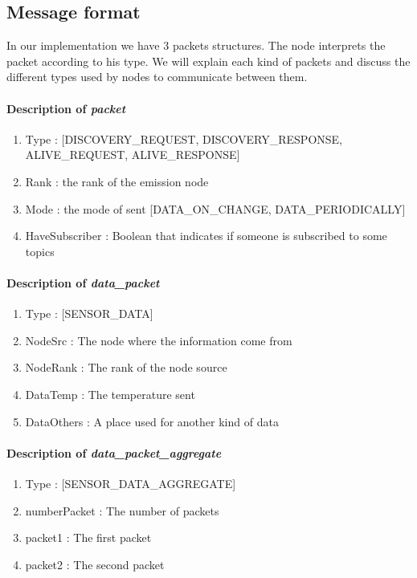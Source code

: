 \documentclass[a4paper,10pt]{article}
\begin{document}
\subsection{Message format}
\label{msgFormat}
In our implementation we have 3 packets structures. The node interprets the packet according to his type. We will explain each kind of packets and discuss the different types used by nodes to communicate between them.

\paragraph{Description of \textit{packet}}
\begin{enumerate}
\item Type : [DISCOVERY\_REQUEST, DISCOVERY\_RESPONSE, ALIVE\_REQUEST, ALIVE\_RESPONSE]
\item Rank : the rank of the emission node
\item Mode : the mode of sent [DATA\_ON\_CHANGE, DATA\_PERIODICALLY]
\item HaveSubscriber : Boolean that indicates if someone is subscribed to some topics
\end{enumerate}

\paragraph{Description of \textit{data\_packet} }
\begin{enumerate}
\item Type : [SENSOR\_DATA]
\item NodeSrc :  The node where the information come from
\item NodeRank : The rank of the node source
\item DataTemp : The temperature sent
\item DataOthers : A place used for another kind of data
\end{enumerate}

\paragraph{Description of \textit{data\_packet\_aggregate} }
\begin{enumerate}
\item Type : [SENSOR\_DATA\_AGGREGATE]
\item numberPacket : The number of packets
\item packet1 :  The first packet
\item packet2 : The second packet
\end{enumerate}
\end{document}
